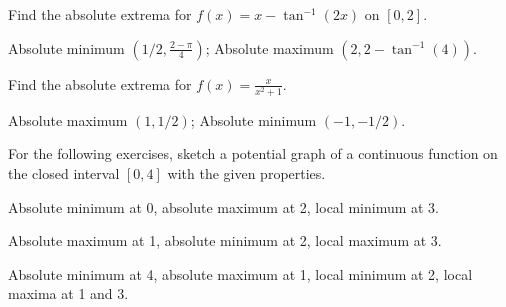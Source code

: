 \begin{enumialphparenastyle}
\begin{ex}
	Find the absolute extrema for $f(x)=x-\tan^{-1}(2x)$ on $[0,2]$.
	\begin{sol}
		Absolute minimum $(1/2,\frac{2-\pi}{4})$; Absolute maximum $(2,2-\tan^{-1}(4))$.
	\end{sol}
\end{ex}

\begin{ex}
	Find the absolute extrema for $f(x)=\frac{x}{x^2+1}$.
	\begin{sol}
		Absolute maximum $(1,1/2)$; Absolute minimum $(-1,-1/2)$. 
	\end{sol}
\end{ex}

For the following exercises, sketch a potential graph of a continuous function on the closed interval $[0,4]$ with the given properties.

\begin{multicols}{2}
	\begin{ex}
		Absolute minimum at 0, absolute maximum at 2, local minimum at 3.
	\end{ex}
	
	\begin{ex}
		Absolute maximum at 1, absolute minimum at 2, local maximum at 3.
	\end{ex}
	
	\begin{ex}
		Absolute minimum at 4, absolute maximum at 1, local minimum at 2, local maxima at 1 and 3.
	\end{ex}
\end{multicols}

\end{enumialphparenastyle}